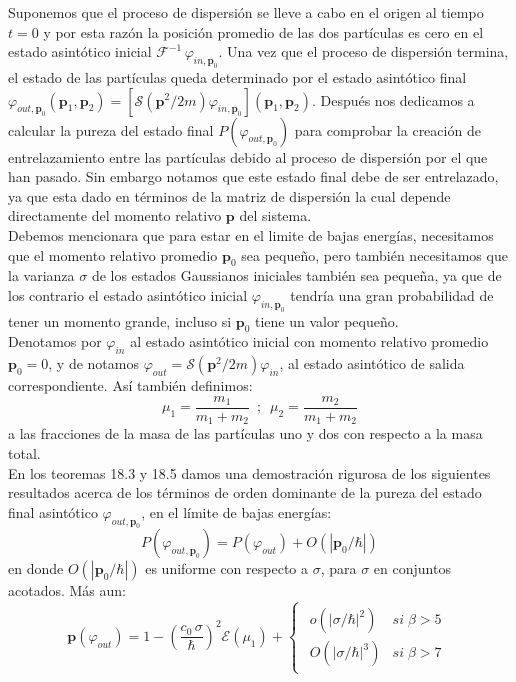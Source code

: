 \documentclass[12pt]{book}
\numberwithin{equation}{chapter}
\def\S{\mathcal{S}}
\def\E{\mathcal{E}}
\def\F{\mathcal{F}}
\def\vp{\varphi}
\def\P{\mathbf{p}}
\begin{document}
Suponemos que el proceso de dispersi\'on se lleve a cabo en el origen al tiempo $t=0$ y por esta raz\'on la posici\'on promedio de las dos part\'iculas es cero en el estado asint\'otico inicial $ \F^{-1}\,\varphi_{in,\P_{0}}$. Una vez que el proceso de dispersi\'on termina, el estado de las part\'iculas queda determinado por el estado asint\'otico final $\varphi_{out,\P_{0}}(\P_{1} , \P_{2}) =\left[ \S(\P^{2} /2m ) \varphi_{in,\P_{0}}  \right] ( \P_{1},\P_{2} )  $. Despu\'es nos dedicamos a calcular la pureza del estado final $P(\varphi_{out,\P_{0}})$ para comprobar la creaci\'on de entrelazamiento entre las part\'iculas debido al proceso de dispersi\'on por el que han pasado. Sin embargo notamos que este estado final debe de ser entrelazado, ya que esta dado en t\'erminos de la matriz de dispersi\'on la cual depende directamente del momento relativo $\P$ del sistema. \\
Debemos mencionara que para estar en el limite de bajas energ\'ias, necesitamos que el momento relativo promedio $\P_{0}$ sea peque\~no, pero tambi\'en necesitamos que la varianza $\sigma$ de los estados Gaussianos iniciales tambi\'en sea peque\~na, ya que de los contrario el estado asint\'otico inicial $\varphi_{ in,\P_{0} }$ tendr\'ia una gran probabilidad de tener un momento grande, incluso si $\P_{0}$ tiene un valor peque\~no.\\
Denotamos por $\varphi_{in}$ al estado asint\'otico inicial con momento relativo promedio $\P_{0}=0$, y de notamos $ \varphi_{out}=\S( \P^{2}/2m ) \varphi_{in} $, al estado asint\'otico de salida correspondiente. As\'i tambi\'en definimos:
$$ \mu_{1} = \frac{m_{1}}{m_{1}+m_{2}} \,\,\,;\,\,\, \mu_{2} = \frac{m_{2}}{m_{1}+m_{2}} $$
a las fracciones de la masa de las part\'iculas uno y dos con respecto a la masa total.\\
En los teoremas 18.3 y 18.5 damos una demostraci\'on rigurosa de los siguientes resultados acerca de los t\'erminos de orden dominante de la pureza del estado final asint\'otico $\varphi_{out,\P_{0}}$, en el l\'imite de bajas energ\'ias:
$$ P (\vp_{out,\P_{0}})= P (\vp_{out})+O(|\P_{0}/\hbar|) $$
en donde $O(|\P_{0}/\hbar|)$ es uniforme con respecto a $\sigma$, para $\sigma$ en conjuntos acotados. M\'as aun:
$$ \P(\vp_{out})= 1 - \left(\frac{c_{0} \, \sigma}{\hbar} \right)^{2}\E(\mu_{1}) +\begin{cases} \begin{matrix} o(|\sigma/\hbar|^{2}) & si\; \beta >5 \\ O(|\sigma/\hbar|^{3}) & si\; \beta > 7 \end{matrix} \end{cases} $$
\end{document}

